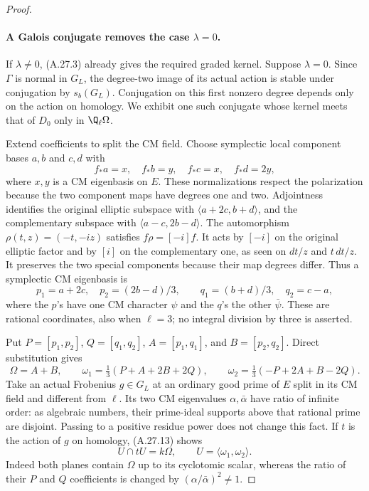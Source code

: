 \begin{proof}
\paragraph{A Galois conjugate removes the case $\lambda=0$.}
If $\lambda\ne0$, (A.27.3) already gives the required
graded kernel. Suppose $\lambda=0$. Since $\Gamma$ is
normal in $G_L$, the degree-two image of its actual
action is stable under conjugation by $s_b(G_L)$.
Conjugation on this first nonzero degree depends only
on the action on homology. We exhibit one such
conjugate whose kernel meets that of $D_0$ only in
$\Q_\ell\Omega$.

Extend coefficients to split the CM field. Choose
symplectic local component bases $a,b$ and $c,d$ with
\[
              f_*a=x,\quad f_*b=y,\quad
              f_*c=x,\quad f_*d=2y,
                                                        \tag{A.27.11}
\]
where $x,y$ is a CM eigenbasis on $E$. These
normalizations respect the polarization because the
two component maps have degrees one and two.
Adjointness identifies the original elliptic subspace
with $\langle a+2c,b+d\rangle$, and the complementary
subspace with $\langle a-c,2b-d\rangle$.
The automorphism $\rho(t,z)=(-t,-iz)$ satisfies
$f\rho=[-i]f$. It acts by $[-i]$ on the original
elliptic factor and by $[i]$ on the complementary one,
as seen on $dt/z$ and $t\,dt/z$. It preserves the two
special components because their map degrees differ.
Thus a symplectic CM eigenbasis is
\[
 p_1=a+2c,\quad p_2=(2b-d)/3,\qquad
 q_1=(b+d)/3,\quad q_2=c-a,
                                                        \tag{A.27.12}
\]
where the $p$'s have one CM character $\psi$ and the
$q$'s the other $\bar\psi$. These are rational
coordinates, also when $\ell=3$; no integral division
by three is asserted.

Put $P=[p_1,p_2]$, $Q=[q_1,q_2]$,
$A=[p_1,q_1]$, and $B=[p_2,q_2]$. Direct substitution
gives
\[
 \Omega=A+B,\qquad
 \omega_1=\tfrac13(P+A+2B+2Q),\qquad
 \omega_2=\tfrac13(-P+2A+B-2Q).
                                                        \tag{A.27.13}
\]
Take an actual Frobenius $g\in G_L$ at an ordinary
good prime of $E$ split in its CM field and different
from $\ell$. Its two CM eigenvalues $\alpha,\bar\alpha$
have ratio of infinite order: as algebraic numbers,
their prime-ideal supports above that rational prime
are disjoint. Passing to a positive residue power
does not change this fact. If $t$ is the action of
$g$ on homology, (A.27.13) shows
\[
 U\cap tU=k\Omega,\qquad
                         U=\langle\omega_1,\omega_2\rangle.
                                                        \tag{A.27.14}
\]
Indeed both planes contain $\Omega$ up to its
cyclotomic scalar, whereas the ratio of their $P$ and
$Q$ coefficients is changed by
$(\alpha/\bar\alpha)^2\ne1$.


\end{proof}
